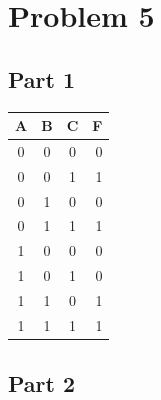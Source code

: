 \documentclass[paper=a4, fontsize=11pt]{scrartcl} %
\numberwithin{equation}{section} %
\numberwithin{figure}{section} %
\numberwithin{table}{section} %
\begin{document}

\section{Problem 5}
\subsection{Part 1}
\begin{center}
	\begin{tabular}{c | c | c || r}
		A & B & C & F \\
		\hline
		0 & 0 & 0 & 0 \\
		\hline
		0 & 0 & 1 & 1 \\
		\hline
		0 & 1 & 0 & 0 \\
		\hline
		0 & 1 & 1 & 1 \\
		\hline
		1 & 0 & 0 & 0 \\
		\hline
		1 & 0 & 1 & 0 \\
		\hline
		1 & 1 & 0 & 1 \\
		\hline
		1 & 1 & 1 & 1 \\
		\hline
	\end{tabular}
\end{center}
\subsection{Part 2}
\inputminted{vhdl}{src/p5-2/p5-2.vhd}

\end{document}
